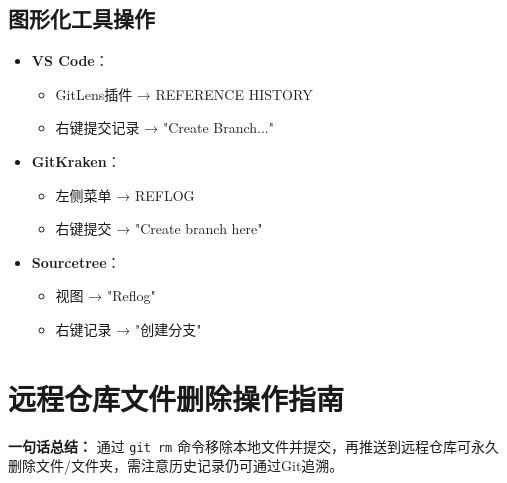 \subsection{图形化工具操作}
\begin{itemize}[leftmargin=*, nosep]
    \item \textbf{VS Code}：
    \begin{itemize}[leftmargin=*, nosep]
        \item GitLens插件 → REFERENCE HISTORY
        \item 右键提交记录 → "Create Branch..."
    \end{itemize}
    
    \item \textbf{GitKraken}：
    
\begin{itemize}[leftmargin=*, nosep]
        \item 左侧菜单 → REFLOG
        \item 右键提交 → "Create branch here"
    \end{itemize}
    
    \item \textbf{Sourcetree}：
    
\begin{itemize}[leftmargin=*, nosep]
        \item 视图 → "Reflog"
        \item 右键记录 → "创建分支"
    \end{itemize}
\end{itemize}

\section{远程仓库文件删除操作指南}
\textbf{一句话总结：}  
通过 \texttt{git rm} 命令移除本地文件并提交，再推送到远程仓库可永久删除文件/文件夹，需注意历史记录仍可通过Git追溯。

